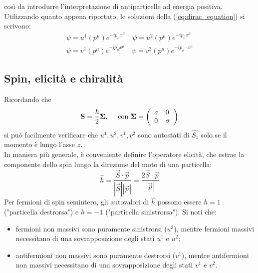 \documentclass{subnucbo}
\begin{document}
così da introdurre l'interpretazione di antiparticelle ad energia positiva. Utilizzando quanto appena riportato, le soluzioni della (\ref{eq:dirac_equation}) si scrivono:
\begin{equation}
        \begin{align}
                \psi = u ^ { 1 } \left( p ^ { \mu } \right) e ^ { - i p_{\mu} x^{\mu} } \quad \psi = u ^ { 2 } \left( p ^ { \mu } \right) e ^ { - i p_{\mu} x^{\mu} } \\ \psi = v ^ { 1 } \left( p ^ { \mu } \right) e ^ { - i p_{\mu}  x^{\mu} } \quad \psi = v ^ { 2 } \left( p ^ { \mu } \right) e ^ { - i p_{\mu} \cdot x^{\mu} }
        \end{align}
        \label{eq:u1u2v1v2}
\end{equation}

\subsection{Spin, elicità e chiralità}
Ricordando che
\begin{equation}
        \mathbf { S } = \frac { \hbar } { 2 } \mathbf { \Sigma } , \quad \text { con } \mathbf { \Sigma } = \left( \begin{array} { l l } { \sigma } & { 0 } \\ { 0 } & { \sigma } \end{array} \right)
\end{equation}
si può facilmente verificare che $u^{1}, u^{2}, v^{1}, v^{2}$ sono autostati di $\hat { S _ { z } }$ solo se il momento è lungo l'asse $z$. \\
In maniera più generale, è conveniente definire l'operatore elicità, che estrae la componente dello spin lungo la direzione del moto di una particella:
\begin{equation}
        \hat { h } = \frac { \vec { S } \cdot \vec { p } } { | \vec { S } | | \vec { p } | } = \frac { 2 \vec { S } \cdot \vec { p } } { | \vec { p } | }
        \label{eq:helicity}
\end{equation}
Per fermioni di spin semintero, gli autovalori di $\hat{h}$ possono essere $h=1$ ("particella destrorsa") e $h=-1$ ("particella sinistrorsa"). Si noti che:
\begin{itemize}
        \item fermioni non massivi sono puramente sinistrorsi ($u^{2}$), mentre fermioni massivi necessitano di una sovrapposizione degli stati $u^{1}$ e $u^{2}$;
        \item antifermioni non massivi sono puramente destrorsi ($v^{1}$), mentre antifermioni non massivi necessitano di una sovrapposizione degli stati $v^{1}$ e $v^{2}$.
\end{itemize}
\end{document}
